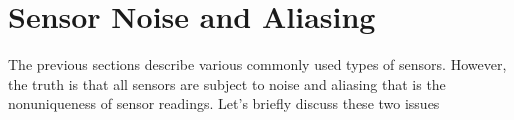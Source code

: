 \section{Sensor Noise and Aliasing}
\label{sensor_noise_aliasing}

The previous sections describe various commonly used types of sensors. However, the truth is that all sensors
are subject to noise and aliasing that is  the nonuniqueness of sensor readings. Let's briefly discuss these two
issues



